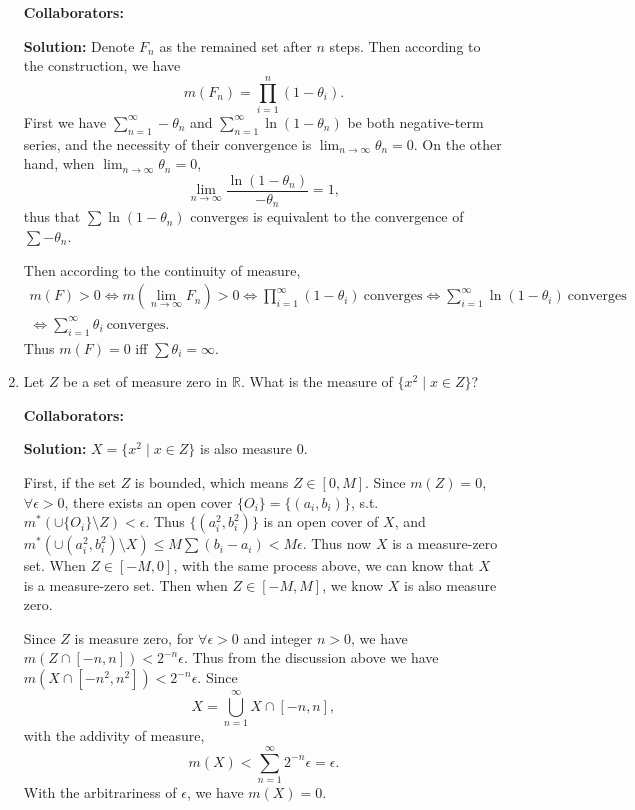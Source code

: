 \documentclass{article}%
\begin{document}
\begin{enumerate}
\bigskip
\textbf{Collaborators:}\\
\smallskip
 
\textbf{Solution:}
Denote $F_n$ as the remained set after $n$ steps. Then according to the construction, we have 
$$
m(F_n) = \prod_{i=1}^{n}(1-\theta_i).
$$
First we have $\sum_{n=1}^{\infty}-\theta_n$ and $\sum_{n=1}^{\infty}\ln(1-\theta_n)$ be both negative-term series, and the necessity of their convergence is $\lim_{n\to\infty}\theta_n = 0$. On the other hand, when $\lim_{n\to\infty} \theta_n = 0$, 
$$
\lim_{n\to\infty}\frac{\ln(1-\theta_n)}{-\theta_n} = 1,
$$
thus that $\sum{\ln(1-\theta_n)}$ converges is equivalent to the convergence of $\sum{-\theta_n}$.

Then according to the continuity of measure,
$$
\begin{aligned}
m(F) > 0 \Leftrightarrow m(\lim_{n\to\infty}F_n) > 0 \Leftrightarrow \prod_{i=1}^{\infty}(1-\theta_i) ~\text{converges} \Leftrightarrow \sum_{i=1}^{\infty} \ln(1-\theta_i) ~\text{converges} \\
\Leftrightarrow \sum_{i=1}^{\infty}\theta_i ~\text{converges}.
\end{aligned}
$$
Thus $m(F) = 0$ iff $\sum{\theta_i} = \infty$.

\bigskip





\item Let $Z$ be a set of measure zero in $\mathbb{R}$.  What is the measure of $\{x^2 \mid x\in Z\}$?



\bigskip
\textbf{Collaborators:}\\
\smallskip
 
\textbf{Solution:}
$X = \{x^2\mid x\in Z\}$ is also measure 0. 

First, if the set $Z$ is bounded, which means $Z\in [0, M]$. Since $m(Z) = 0$, $\forall \epsilon > 0$, there exists an open cover $\{O_i\} = \{(a_i, b_i)\}$, s.t. $m^*(\cup\{O_i\}\setminus Z) < \epsilon$. Thus $\{(a_i^2, b_i^2)\}$ is an open cover of $X$, and $m^*(\cup(a_i^2, b_i^2)\setminus X) \le M\sum(b_i-a_i) < M\epsilon$. Thus now $X$ is a measure-zero set. When $Z \in [-M, 0]$, with the same process above, we can know that $X$ is a measure-zero set. Then when $Z \in [-M, M]$, we know $X$ is also measure zero.

Since $Z$ is measure zero, for $\forall \epsilon > 0$ and integer $n > 0$, we have $m(Z\cap [-n, n]) < 2^{-n}\epsilon$. Thus from the discussion above we have $m(X\cap [-n^2, n^2]) < 2^{-n}\epsilon$. Since 
$$
X = \bigcup_{n=1}^{\infty}X\cap[-n, n],
$$
with the addivity of measure, 
$$
m(X) < \sum_{n=1}^{\infty}2^{-n}\epsilon = \epsilon.
$$
With the arbitrariness of $\epsilon$, we have $m(X) = 0$.
\bigskip



\end{enumerate}
\end{document}
